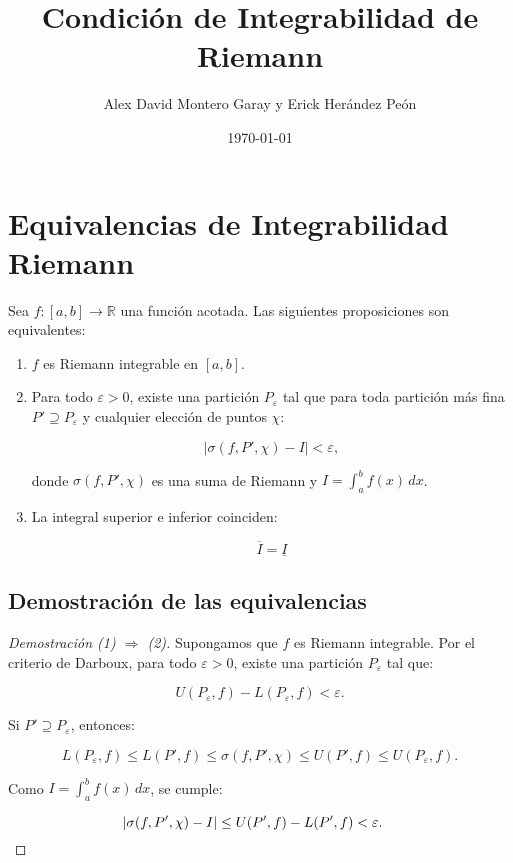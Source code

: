 \documentclass{article}
\title{Condición de Integrabilidad de Riemann}
\author{Alex David Montero Garay y Erick Herández Peón }
\date{\today}
\begin{document}
	\maketitle
	
	\section{Equivalencias de Integrabilidad Riemann}
	Sea \( f: [a, b] \to \mathbb{R} \) una función acotada. Las siguientes proposiciones son equivalentes:
	
	\begin{enumerate}
		\item \( f \) es Riemann integrable en \([a, b]\).
		\item Para todo \( \varepsilon > 0 \), existe una partición \( P_\varepsilon \) tal que para toda partición más fina \( P' \supseteq P_\varepsilon \) y cualquier elección de puntos \( \chi \):
		
		
		\[
		|\sigma(f, P', \chi) - I| < \varepsilon,
		\]
		
		
		donde \( \sigma(f, P', \chi) \) es una suma de Riemann y \( I = \int_a^b f(x)\, dx \).
		\item La integral superior e inferior coinciden:
		
		
		\[
		\overline{I} = \underline{I} 
		\]
		
		
	\end{enumerate}
	
	\subsection*{Demostración de las equivalencias}
	
	\begin{proof}[Demostración (1) \(\Rightarrow\) (2)]
		Supongamos que \( f \) es Riemann integrable. Por el criterio de Darboux, para todo \( \varepsilon > 0 \), existe una partición \( P_\varepsilon \) tal que:
		
		
		\[
		U(P_\varepsilon, f) - L(P_\varepsilon, f) < \varepsilon.
		\]
		
		
		Si \( P' \supseteq P_\varepsilon \), entonces:
		
		
		\[
		L(P_\varepsilon, f) \leq L(P', f) \leq \sigma(f, P', \chi) \leq U(P', f) \leq U(P_\varepsilon, f).
		\]
		
		
		Como \( I = \int_a^b f(x)\, dx \), se cumple:
		
		
		\[
		|\sigma(f, P', \chi) - I| \leq U(P', f) - L(P', f) < \varepsilon. \quad \qedhere
		\]
	\end{proof}
	
\end{document}

